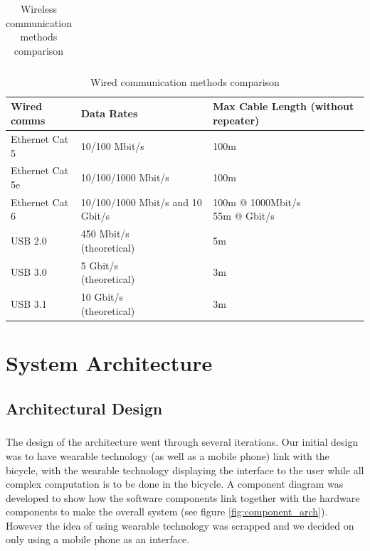 \documentclass[a4paper]{report}
\begin{document}
{\begin{landscape}
\begin{table}[h]
\begin{tabular}{ | m{3cm} | m{3cm} | m{3.5cm} | m{3cm} | m{3cm} | m{2.5cm} |}
    \end{tabular}

\caption[Table caption text]{Wireless communication methods comparison} 
\label{table:wireless_comp}
\end{table}

\end{landscape}

\begin{table}[h]
\center

    \begin{tabular}{ | m{2.5cm} | m{2.5cm} | m{3.5cm} | }
    \hline
    \textbf{Wired comms} & \textbf{Data Rates} & \textbf{Max Cable Length (without repeater) } \\ \hline
  
  Ethernet Cat 5  & 10/100 Mbit/s & 100m\\ \hline 
  Ethernet Cat 5e & 10/100/1000 Mbit/s & 100m\\ \hline
  Ethernet Cat 6 & 10/100/1000 Mbit/s and 10 Gbit/s & \pbox{20cm}{100m @ 1000Mbit/s \\55m @ Gbit/s} \\ \hline
   USB 2.0 & \pbox{20cm}{450 Mbit/s \\(theoretical)} & 5m \\ \hline
   USB 3.0 & \pbox{20cm}{5 Gbit/s \\(theoretical)} & 3m\\ \hline
   USB 3.1 & \pbox{20cm}{10 Gbit/s \\(theoretical)} & 3m\\ \hline
    \end{tabular}

\caption[Table caption text]{Wired communication methods comparison} 
\label{table:wired_comp}
\end{table}

\chapter{System Architecture}

\section{Architectural Design}
\paragraph{}The design of the architecture went through several iterations. Our initial design was to have wearable technology (as well as a mobile phone) link with the bicycle, with the wearable technology displaying the interface to the user while all complex computation is to be done in the bicycle. A component diagram was developed to show how the software components link together with the hardware components to make the overall system (see figure \ref{fig:component_arch}). However the idea of using wearable technology was scrapped and we decided on only using a mobile phone as an interface. 

}
\end{document}

